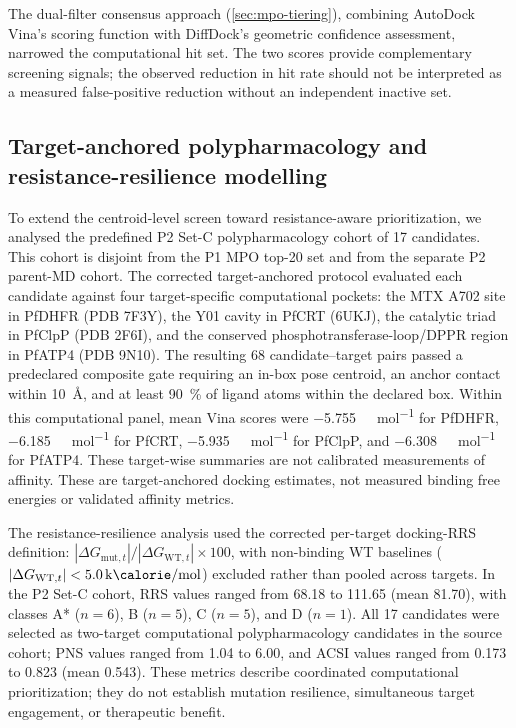 \documentclass[journal=jcisd8,manuscript=article]{achemso}
\begin{document}


The dual-filter consensus approach (\cref{sec:mpo-tiering}), combining AutoDock Vina's scoring function with DiffDock's geometric confidence assessment, narrowed the computational hit set. The two scores provide complementary screening signals; the observed reduction in hit rate should not be interpreted as a measured false-positive reduction without an independent inactive set.

\subsection{Target-anchored polypharmacology and resistance-resilience modelling}
\label{sec:integrated_polypharm}

To extend the centroid-level screen toward resistance-aware prioritization, we analysed the predefined P2 Set-C polypharmacology cohort of \num{17} candidates. This cohort is disjoint from the P1 MPO top-\num{20} set and from the separate P2 parent-MD cohort. The corrected target-anchored protocol evaluated each candidate against four target-specific computational pockets: the MTX A702 site in PfDHFR (PDB 7F3Y), the Y01 cavity in PfCRT (6UKJ), the catalytic triad in PfClpP (PDB 2F6I), and the conserved phosphotransferase-loop/DPPR region in PfATP4 (PDB 9N10). The resulting \num{68} candidate--target pairs passed a predeclared composite gate requiring an in-box pose centroid, an anchor contact within \qty{10}{\angstrom}, and at least \qty{90}{\percent} of ligand atoms within the declared box. Within this computational panel, mean Vina scores were \qty{-5.755}{\kilo\calorie\per\mole} for PfDHFR, \qty{-6.185}{\kilo\calorie\per\mole} for PfCRT, \qty{-5.935}{\kilo\calorie\per\mole} for PfClpP, and \qty{-6.308}{\kilo\calorie\per\mole} for PfATP4. These target-wise summaries are not calibrated measurements of affinity. These are target-anchored docking estimates, not measured binding free energies or validated affinity metrics.

The resistance-resilience analysis used the corrected per-target docking-RRS definition: $|\Delta G_{\mathrm{mut},t}|/|\Delta G_{\mathrm{WT},t}| \times \num{100}$, with non-binding WT baselines ($|\Delta G_{\mathrm{WT},t}| < \qty{5.0}{\kilo\calorie\per\mole}$) excluded rather than pooled across targets. In the P2 Set-C cohort, RRS values ranged from \num{68.18} to \num{111.65} (mean \num{81.70}), with classes A* ($n=\num{6}$), B ($n=\num{5}$), C ($n=\num{5}$), and D ($n=\num{1}$). All \num{17} candidates were selected as two-target computational polypharmacology candidates in the source cohort; PNS values ranged from \num{1.04} to \num{6.00}, and ACSI values ranged from \num{0.173} to \num{0.823} (mean \num{0.543}). These metrics describe coordinated computational prioritization; they do not establish mutation resilience, simultaneous target engagement, or therapeutic benefit.
\end{document}
